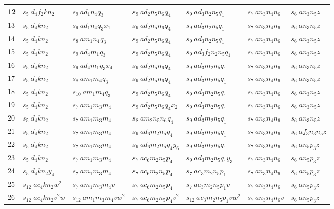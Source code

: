 \documentclass[preliminary,copyright,creativecommons]{eptcs}
\newcommand{\myway}[1]{\raisebox{-4pt}{\rule{0pt}{16pt}}\colorbox[rgb]{.7,.7,.7}{#1}}
\theoremstyle{remark}
\begin{document}
\begin{table}[h]
\begin{center}
\begin{tabular}{ | l | l | l | l | l | l | l | }
12 & $s_5~ d_4f_2kn_2$ & $s_9~ ad_1n_4q_3$ & $s_9~ ad_2n_5n_6q_4$ & $s_9~ ad_3n_2n_5q_1$ & $s_7~ an_3n_4n_6$ & $s_6~ an_3n_5z$ \\ \hline
13 & $s_5~ d_4kn_2$ & $s_9~ ad_1n_4q_3x_1$ & $s_9~ ad_2n_5n_6q_4$ & $s_9~ ad_3n_2n_5q_1$ & $s_7~ an_3n_4n_6$ & $s_6~ an_3n_5z$ \\ \hline
14 & $s_5~ d_4kn_2$ & $s_8~ am_1n_4q_3$ & $s_9~ ad_2n_5n_6q_4$ & $s_9~ ad_3n_2n_5q_1$ & $s_7~ an_3n_4n_6$ & $s_6~ an_3n_5z$ \\ \hline
15 & $s_5~ d_4kn_2$ & $s_9~ ad_4m_1q_3$ & $s_9~ ad_2n_5n_6q_4$ & $s_9~ ad_3f_2n_2n_5q_1$ & $s_7~ an_3n_4n_6$ & $s_6~ an_3n_5z$ \\ \hline
16 & $s_5~ d_4kn_2$ & $s_9~ ad_4m_1q_3x_4$ & $s_9~ ad_2n_5n_6q_4$ & $s_9~ ad_3m_2n_5q_1$ & $s_7~ an_3n_4n_6$ & $s_6~ an_3n_5z$ \\ \hline
17 & $s_5~ d_4kn_2$ & $s_8~ am_1m_4q_3$ & $s_9~ ad_2n_5n_6q_4$ & $s_9~ ad_3m_2n_5q_1$ & $s_7~ an_3n_4n_6$ & $s_6~ an_3n_5z$ \\ \hline
18 & $s_5~ d_4kn_2$ & $s_{10}~ am_1m_4q_3$ & $s_9~ ad_2n_5n_6q_4$ & $s_9~ ad_3m_2n_5q_1$ & $s_7~ an_3n_4n_6$ & $s_6~ an_3n_5z$ \\ \hline
19 & $s_5~ d_4kn_2$ & $s_7~ am_1m_3m_4$ & $s_9~ ad_2n_5n_6q_4x_2$ & $s_9~ ad_3m_2n_5q_1$ & $s_7~ an_3n_4n_6$ & $s_6~ an_3n_5z$ \\ \hline
20 & $s_5~ d_4kn_2$ & $s_7~ am_1m_3m_4$ & $s_8~ am_2n_5n_6q_4$ & $s_9~ ad_3m_2n_5q_1$ & $s_7~ an_3n_4n_6$ & $s_6~ an_3n_5z$ \\ \hline
21 & $s_5~ d_4kn_2$ & $s_7~ am_1m_3m_4$ & $s_9~ ad_6m_2n_5q_4$ & $s_9~ ad_3m_2n_5q_1$ & $s_7~ an_3n_4n_6$ & $s_6~ af_3n_3n_5z$ \\ \hline
22 & $s_5~ d_4kn_2$ & $s_7~ am_1m_3m_4$ & $s_9~ ad_6m_2n_5q_4y_6$ & $s_9~ ad_3m_2n_5q_1$ & $s_7~ an_3n_4n_6$ & \myway{$s_6~ an_5p_3z$} \\ \hline
23 & $s_5~ d_4kn_2$ & $s_7~ am_1m_3m_4$ & \myway{$s_7~ ac_6m_2n_5p_4$} & $s_9~ ad_3m_2n_5q_1y_3$ & $s_7~ an_3n_4n_6$ & $s_6~ an_5p_3z$ \\ \hline
24 & $s_5~ d_4kn_2y_4$ & $s_7~ am_1m_3m_4$ & $s_7~ ac_6m_2n_5p_4$ & \myway{$s_7~ ac_3m_2n_5p_1$} & $s_7~ an_3n_4n_6$ & $s_6~ an_5p_3z$ \\ \hline
25 & \myway{$s_{12}~ ac_4kn_2w^{2}$} & $s_7~ am_1m_3m_4v$ & $s_7~ ac_6m_2n_5p_4$ & $s_7~ ac_3m_2n_5p_1v$ & $s_7~ an_3n_4n_6$ & $s_6~ an_5p_3z$ \\ \hline
26 & $s_{12}~ ac_4kn_2v^{2}w$ & $s_{12}~ am_1m_3m_4vw^{2}$ & $s_7~ ac_6m_2n_5p_4v^{2}$ & $s_{12}~ ac_3m_2n_5p_1vw^{2}$ & $s_7~ an_3n_4n_6v$ & $s_6~ an_5p_3z$ \\ \hline

\end{tabular}
\end{center}
\end{table}
\end{document}
